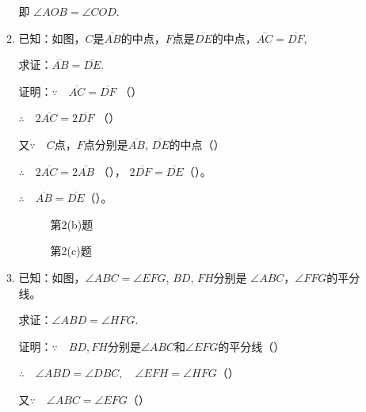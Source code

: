 \begin{enumerate}
\begin{enumerate}
即 $\angle AOB=\angle COD$.

\item 已知：如图，$C$是$\overline{AB}$的中点，$F$点是$\overline{DE}$的中点，$\overline{AC}=\overline{DF}$, 

求证：$\overline{AB}=\overline{DE}$.

证明：$\because\quad \overline{AC}=\overline{DF}$ （\qquad）

$\therefore\quad 2\overline{AC}=2\overline{DF}$ （\qquad）

又$\because\quad C$点，$F$点分别是$\overline{AB}$, $\overline{DE}$的中点（\qquad）

$\therefore\quad 2\overline{AC}=2\overline{AB}$ （\qquad），
$2\overline{DF}=\overline{DE}$（\qquad）。

$\therefore\quad \overline{AB}=\overline{DE}$（\qquad）。

\begin{figure}[htp]\centering
    \begin{minipage}[t]{0.48\textwidth}
    \centering
{}
    \caption*{第2(b)题}
    \end{minipage}
    \begin{minipage}[t]{0.48\textwidth}
    \centering
    \caption*{第2(c)题}
    \end{minipage}
    \end{figure}


\item 已知：如图，$\angle ABC=\angle EFG$, $BD$, $FH$分别是
$\angle ABC$，$\angle FFG$的平分线。

求证：$\angle ABD=\angle HFG$.

证明：$\because\quad BD, FH$分别是$\angle ABC$和$\angle EFG$的平分线（\qquad ）

$\therefore\quad \angle ABD=\angle DBC,\quad \angle EFH=\angle HFG$（\qquad）

又$\because\quad \angle ABC=\angle EFG$（\qquad）


\end{enumerate}
\end{enumerate}
